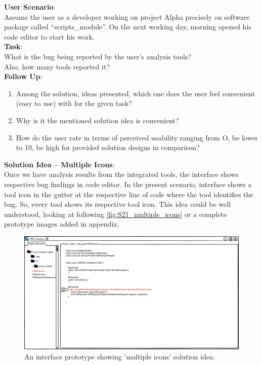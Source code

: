 \clearpage
\textbf{User Scenario}: \\

Assume the user as a developer working on project Alpha precisely on software package called “scripts\_module”. On the next working day, morning opened his code editor to start his work. \\

\textbf{Task}: \\

What is the bug being reported by the user’s analysis tools? \\ Also, how many tools reported it? \\

\textbf{Follow Up}:

\begin{enumerate}
\item Among the solution, ideas presented, which one does the user feel convenient (easy to use) with for the given task?
\item Why is it the mentioned solution idea is convenient?
\item How do the user rate in terms of perceived usability ranging from O, be lower to 10, be high for provided solution designs in comparison? \\
\end{enumerate}

\textbf{Solution Idea – Multiple Icons}: \\

Once we have analysis results from the integrated tools, the interface shows respective bug findings in code editor. In the present scenario, interface shows a tool icon in the gutter at the respective line of code where the tool identifies the bug. So, every tool shows its respective tool icon. This idea could be well understood, looking at following \autoref{fig:S21_multiple_icons} or a complete prototype images added in appendix. \\


\begin{figure}[hbt!]
	\centering
	\includegraphics[width=\linewidth]{figures/solution_ideas_snaps/S21_multiple_icons}
	\caption{An interface prototype showing 'multiple icons' solution idea.}
	\label{fig:S21_multiple_icons}
\end{figure}

